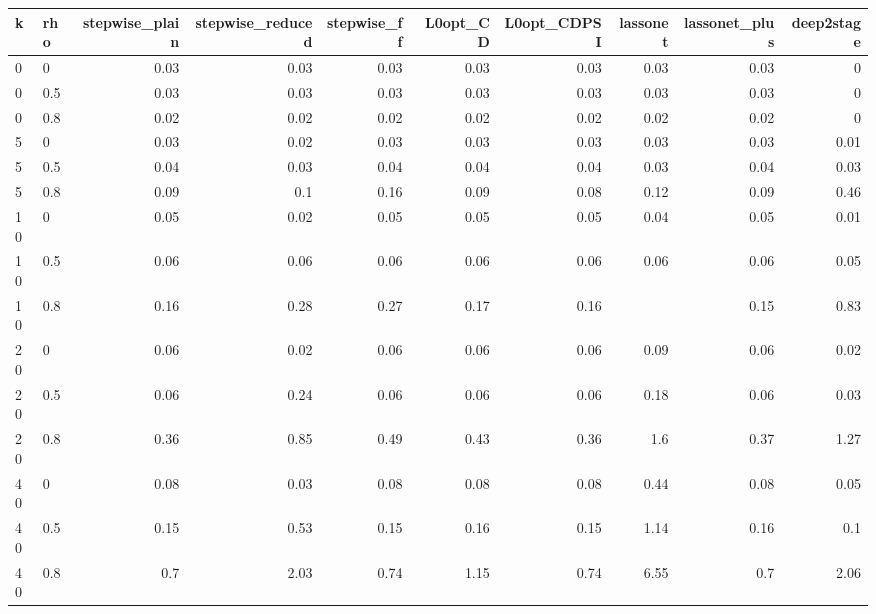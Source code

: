 \begin{tabular}{llrrrrrrrr}
\toprule
k & rho & stepwise\_plain & stepwise\_reduced & stepwise\_ff & L0opt\_CD & L0opt\_CDPSI & lassonet & lassonet\_plus & deep2stage \\
\midrule
0 & 0 & 0.03 & 0.03 & 0.03 & 0.03 & 0.03 & 0.03 & 0.03 & 0 \\
0 & 0.5 & 0.03 & 0.03 & 0.03 & 0.03 & 0.03 & 0.03 & 0.03 & 0 \\
0 & 0.8 & 0.02 & 0.02 & 0.02 & 0.02 & 0.02 & 0.02 & 0.02 & 0 \\
5 & 0 & 0.03 & 0.02 & 0.03 & 0.03 & 0.03 & 0.03 & 0.03 & 0.01 \\
5 & 0.5 & 0.04 & 0.03 & 0.04 & 0.04 & 0.04 & 0.03 & 0.04 & 0.03 \\
5 & 0.8 & 0.09 & 0.1 & 0.16 & 0.09 & 0.08 & 0.12 & 0.09 & 0.46 \\
10 & 0 & 0.05 & 0.02 & 0.05 & 0.05 & 0.05 & 0.04 & 0.05 & 0.01 \\
10 & 0.5 & 0.06 & 0.06 & 0.06 & 0.06 & 0.06 & 0.06 & 0.06 & 0.05 \\
10 & 0.8 & 0.16 & 0.28 & 0.27 & 0.17 & 0.16 &  & 0.15 & 0.83 \\
20 & 0 & 0.06 & 0.02 & 0.06 & 0.06 & 0.06 & 0.09 & 0.06 & 0.02 \\
20 & 0.5 & 0.06 & 0.24 & 0.06 & 0.06 & 0.06 & 0.18 & 0.06 & 0.03 \\
20 & 0.8 & 0.36 & 0.85 & 0.49 & 0.43 & 0.36 & 1.6 & 0.37 & 1.27 \\
40 & 0 & 0.08 & 0.03 & 0.08 & 0.08 & 0.08 & 0.44 & 0.08 & 0.05 \\
40 & 0.5 & 0.15 & 0.53 & 0.15 & 0.16 & 0.15 & 1.14 & 0.16 & 0.1 \\
40 & 0.8 & 0.7 & 2.03 & 0.74 & 1.15 & 0.74 & 6.55 & 0.7 & 2.06 \\
\bottomrule
\end{tabular}
